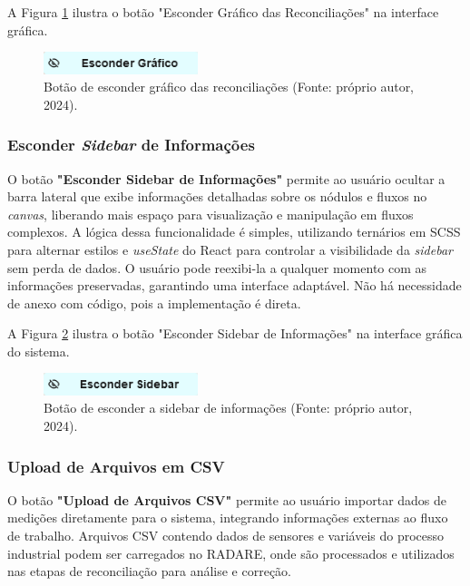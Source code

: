 A Figura \ref{Fig
} ilustra o botão "Esconder Gráfico das Reconciliações" na interface gráfica.

\begin{figure}[htbp] \centering \includegraphics[width=0.4\textwidth]{figuras/hide-graphbar-button.png} \caption{Botão de esconder gráfico das reconciliações (Fonte: próprio autor, 2024).} \label{Fig
} \end{figure}

\subsubsection{Esconder \textit{Sidebar} de Informações}

O botão \textbf{"Esconder Sidebar de Informações"} permite ao usuário ocultar a barra lateral que exibe informações detalhadas sobre os nódulos e fluxos no \textit{canvas}, liberando mais espaço para visualização e manipulação em fluxos complexos. A lógica dessa funcionalidade é simples, utilizando ternários em SCSS para alternar estilos e \textit{useState} do React para controlar a visibilidade da \textit{sidebar} sem perda de dados. O usuário pode reexibi-la a qualquer momento com as informações preservadas, garantindo uma interface adaptável. Não há necessidade de anexo com código, pois a implementação é direta.

A Figura \ref{Fig:HideSidebarButton} ilustra o botão "Esconder Sidebar de Informações" na interface gráfica do sistema.

\begin{figure}[htbp]
    \centering
    \includegraphics[width=0.4\textwidth]{figuras/hide-sidebar-button.png}
    \caption{Botão de esconder a sidebar de informações (Fonte: próprio autor, 2024).}
    \label{Fig:HideSidebarButton}
\end{figure}

\subsubsection{Upload de Arquivos em CSV}

O botão \textbf{"Upload de Arquivos CSV"} permite ao usuário importar dados de medições diretamente para o sistema, integrando informações externas ao fluxo de trabalho. Arquivos CSV contendo dados de sensores e variáveis do processo industrial podem ser carregados no RADARE, onde são processados e utilizados nas etapas de reconciliação para análise e correção.

